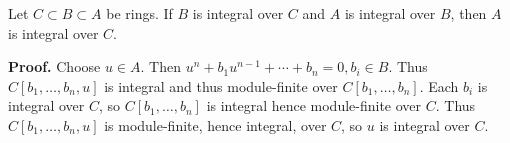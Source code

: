 \documentclass[12pt]{article}
\begin{document}
Let $C\subset B\subset A$ be rings. If $B$ is integral over $C$ and $A$ is integral over $B$, then $A$ is integral over $C$.

\textbf{Proof. }
Choose $u\in A$. Then $u^n+b_1 u^{n-1}+\cdots+b_n=0, b_i\in B$. Thus $C[b_1,\ldots,b_n,u]$ is integral and thus module-finite over $C[b_1,\ldots,b_n]$. Each $b_i$ is integral over $C$, so $C[b_1,\ldots,b_n]$ is integral hence module-finite over $C$. Thus $C[b_1,\ldots,b_n,u]$ is module-finite, hence integral, over $C$, so $u$ is integral over $C$.

\end{document}
